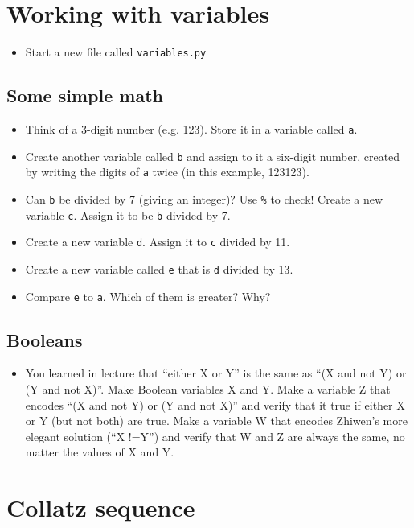 \documentclass[pdflatex,a4paper]{article}
\begin{document}
\section{Working with variables}

\begin{itemize}
\item
Start a new file called \verb=variables.py=
\end{itemize}


\subsection{Some simple math}

\begin{itemize}
\item
Think of a 3-digit number (e.g. 123). Store it in a variable called \verb=a=. 
\item
Create another variable called \verb=b= and assign to it a six-digit number, created by writing the digits of \verb=a= twice (in this example, 123123). 
\item
Can \verb=b= be divided by 7 (giving an integer)?  Use \verb=%= to check!  Create a new variable \verb=c=. Assign it to be \verb=b= divided by 7.
\item
Create a new variable \verb=d=. Assign it to \verb=c= divided by 11.
\item
Create a new variable called \verb=e= that is \verb=d= divided by 13.
\item
Compare \verb=e= to \verb=a=. Which of them is greater? Why?
\end{itemize}

\subsection{Booleans}

\begin{itemize}
\item
You learned in lecture that ``either X or Y'' is the same as ``(X and not Y) or (Y and not X)''. Make Boolean variables X and Y. Make a variable Z that encodes ``(X and not Y) or (Y and not X)'' and verify that it true if either X or Y (but not both) are true. Make a variable W that encodes Zhiwen's more elegant solution (``X !=Y'') and verify that W and Z are always the same, no matter the values of X and Y. 
\end{itemize}

\section{Collatz sequence}
\end{document}
